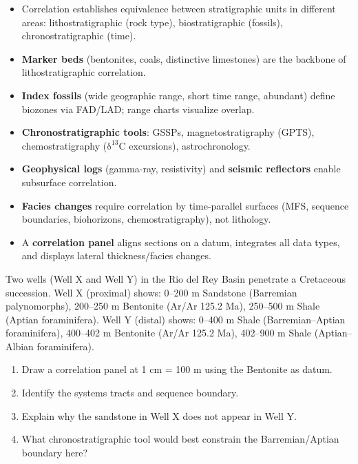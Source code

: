 \documentclass[11pt]{article}
\newcounter{popsec}
\newcounter{popsub}
\newcommand{\courssub}[1]{%
  \stepcounter{popsub}%
  \par\vspace{9pt}\noindent{\popxbold\fontsize{11.5}{13}\selectfont\color{popink}{\color{poporange}\thepopsec.\thepopsub}\hspace{6pt}#1}\par\nopagebreak\vspace{4pt}
}
\begin{document}
\courssub{Summary and Key Takeaways}

\begin{aretenir}
\begin{itemize}
\item Correlation establishes equivalence between stratigraphic units in different areas: lithostratigraphic (rock type), biostratigraphic (fossils), chronostratigraphic (time).
\item \textbf{Marker beds} (bentonites, coals, distinctive limestones) are the backbone of lithostratigraphic correlation.
\item \textbf{Index fossils} (wide geographic range, short time range, abundant) define biozones via FAD/LAD; range charts visualize overlap.
\item \textbf{Chronostratigraphic tools}: GSSPs, magnetostratigraphy (GPTS), chemostratigraphy (\ensuremath{\mathrm{\delta^{13}C}} excursions), astrochronology.
\item \textbf{Geophysical logs} (gamma-ray, resistivity) and \textbf{seismic reflectors} enable subsurface correlation.
\item \textbf{Facies changes} require correlation by time-parallel surfaces (MFS, sequence boundaries, biohorizons, chemostratigraphy), not lithology.
\item A \textbf{correlation panel} aligns sections on a datum, integrates all data types, and displays lateral thickness/facies changes.
\end{itemize}
\end{aretenir}

\begin{exercice}
Two wells (Well X and Well Y) in the Rio del Rey Basin penetrate a Cretaceous succession. Well X (proximal) shows: 0--200 m Sandstone (Barremian palynomorphs), 200--250 m Bentonite (Ar/Ar 125.2 Ma), 250--500 m Shale (Aptian foraminifera). Well Y (distal) shows: 0--400 m Shale (Barremian--Aptian foraminifera), 400--402 m Bentonite (Ar/Ar 125.2 Ma), 402--900 m Shale (Aptian--Albian foraminifera).
\begin{enumerate}
\item Draw a correlation panel at 1 cm = 100 m using the Bentonite as datum.
\item Identify the systems tracts and sequence boundary.
\item Explain why the sandstone in Well X does not appear in Well Y.
\item What chronostratigraphic tool would best constrain the Barremian/Aptian boundary here?
\end{enumerate}
\end{exercice}
\end{document}
